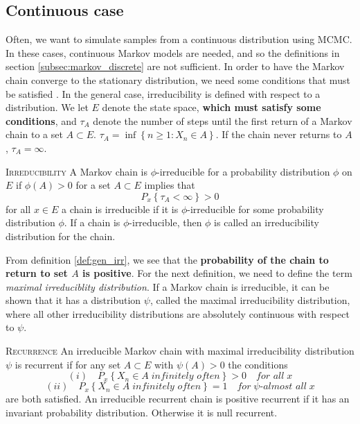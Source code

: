 \subsection{Continuous case}
Often, we want to simulate samples from a continuous distribution using MCMC. In these cases, continuous Markov models are needed, and so the definitions in section \ref{subsec:markov_discrete} are not sufficient. 
In order to have the Markov chain converge to the stationary distribution, we need some conditions that must be satisfied \cite{MCMC_in_pract}. 
In the general case, irreducibility is defined with respect to a distribution. 
We let $E$ denote the state space, \textbf{which must satisfy some conditions}, and $\tau_A$ denote the number of steps until the first return of a Markov chain to a set $A\subset E$.  
$\tau_A = \inf\left\{n\geq 1 : X_n \in A\right\}$. If the chain never returns to $A$, $\tau_A = \infty$.
\begin{definition}{\textsc{Irreducibility}}\label{def:gen_irr}
   A Markov chain is $\phi$-irreducible for a probability distribution $\phi$ on $E$ if $\phi\left(A\right) > 0$ for a set $A\subset E$ implies that $$P_x\left\{\tau_A < \infty\right\} > 0$$ for all $x\in E$ a chain is irreducible if it is $\phi$-irreducible for some probability distribution $\phi$. If a chain is $\phi$-irreducible, then $\phi$ is called an irreducibility distribution for the chain. 
\end{definition}
From definition \ref{def:gen_irr}, we see that the \textbf{probability of the chain to return to set $A$ is positive}.  
For the next definition, we need to define the term \textit{maximal irreduciblity distribution}. If a Markov chain is irreducible, it can be shown that it has a distribution $\psi$, called the maximal irreducibility distribution, where all other irreducibility distributions are absolutely continuous with respect to $\psi$.  
\begin{definition}{\textsc{Recurrence}}
An irreducible Markov chain with maximal irreducibility distribution $\psi$ is recurrent if for any set $A\subset E$ with $\psi\left(A\right)>0$ the conditions
$$(i)\quad P_x \left\{X_n \in A \; \textit{infinitely often}\right\} > 0\quad \textit{for all}\; x$$ 
$$(ii) \quad P_x\left\{X_n\in A \; \textit{infinitely often} \right\} = 1 \quad \textit{for}\;\psi \textit{-almost all} \; x$$
are both satisfied. An irreducible recurrent chain is positive recurrent if it has an invariant probability distribution.
Otherwise it is null recurrent. 
\end{definition}
